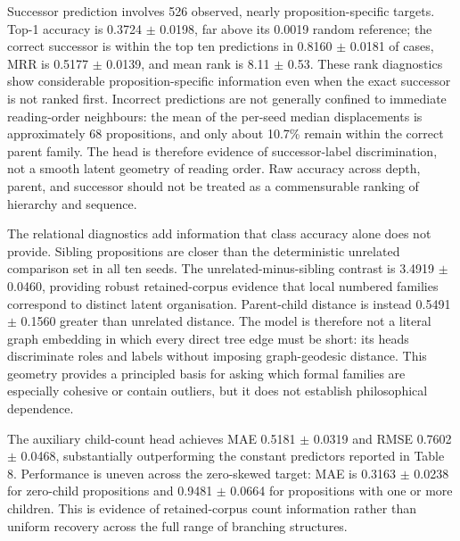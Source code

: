 \documentclass[webpdf,modern,medium,namedate]{oup-authoring-template}
\begin{document}
Successor prediction involves 526 observed, nearly proposition-specific targets. Top-1 accuracy is 0.3724 $\pm$ 0.0198, far above its 0.0019 random reference; the correct successor is within the top ten predictions in 0.8160 $\pm$ 0.0181 of cases, MRR is 0.5177 $\pm$ 0.0139, and mean rank is 8.11 $\pm$ 0.53. These rank diagnostics show considerable proposition-specific information even when the exact successor is not ranked first. Incorrect predictions are not generally confined to immediate reading-order neighbours: the mean of the per-seed median displacements is approximately 68 propositions, and only about 10.7\% remain within the correct parent family. The head is therefore evidence of successor-label discrimination, not a smooth latent geometry of reading order. Raw accuracy across depth, parent, and successor should not be treated as a commensurable ranking of hierarchy and sequence.

The relational diagnostics add information that class accuracy alone does not provide. Sibling propositions are closer than the deterministic unrelated comparison set in all ten seeds. The unrelated-minus-sibling contrast is 3.4919 $\pm$ 0.0460, providing robust retained-corpus evidence that local numbered families correspond to distinct latent organisation. Parent-child distance is instead 0.5491 $\pm$ 0.1560 greater than unrelated distance. The model is therefore not a literal graph embedding in which every direct tree edge must be short: its heads discriminate roles and labels without imposing graph-geodesic distance. This geometry provides a principled basis for asking which formal families are especially cohesive or contain outliers, but it does not establish philosophical dependence.

The auxiliary child-count head achieves MAE 0.5181 $\pm$ 0.0319 and RMSE 0.7602 $\pm$ 0.0468, substantially outperforming the constant predictors reported in Table 8. Performance is uneven across the zero-skewed target: MAE is 0.3163 $\pm$ 0.0238 for zero-child propositions and 0.9481 $\pm$ 0.0664 for propositions with one or more children. This is evidence of retained-corpus count information rather than uniform recovery across the full range of branching structures.
\end{document}

